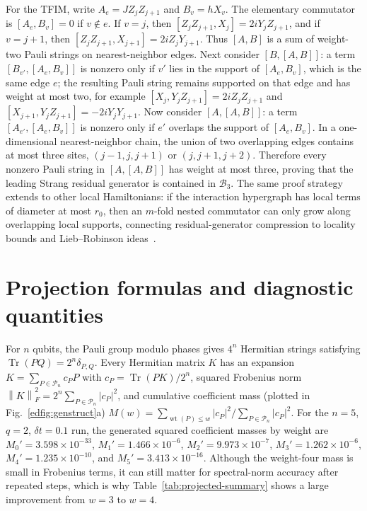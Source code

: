 \documentclass[aps,prresearch,reprint,superscriptaddress,nofootinbib,amsmath,amssymb]{revtex4-2}
\newcommand{\tfim}{TFIM}
\newcommand{\norm}[1]{\left\lVert #1 \right\rVert}
\newcommand{\abs}[1]{\left\lvert #1 \right\rvert}
\newcommand{\Tr}{\operatorname{Tr}}
\newcommand{\cB}{\mathcal{B}}
\newcommand{\cP}{\mathcal{P}}
\newcommand{\dt}{\delta t}
\begin{document}
For the \tfim{}, write $A_e=JZ_jZ_{j+1}$ and $B_v=hX_v$. The elementary commutator is $[A_e,B_v]=0$ if $v\notin e$. If $v=j$, then $[Z_jZ_{j+1},X_j]=2iY_jZ_{j+1}$, and if $v=j+1$, then $[Z_jZ_{j+1},X_{j+1}]=2iZ_jY_{j+1}$. Thus $[A,B]$ is a sum of weight-two Pauli strings on nearest-neighbor edges. Next consider $[B,[A,B]]$: a term $[B_{v'},[A_e,B_v]]$ is nonzero only if $v'$ lies in the support of $[A_e,B_v]$, which is the same edge $e$; the resulting Pauli string remains supported on that edge and has weight at most two, for example $[X_j,Y_jZ_{j+1}]=2iZ_jZ_{j+1}$ and $[X_{j+1},Y_jZ_{j+1}]=-2iY_jY_{j+1}$. Now consider $[A,[A,B]]$: a term $[A_{e'},[A_e,B_v]]$ is nonzero only if $e'$ overlaps the support of $[A_e,B_v]$. In a one-dimensional nearest-neighbor chain, the union of two overlapping edges contains at most three sites, $(j-1,j,j+1)$ or $(j,j+1,j+2)$. Therefore every nonzero Pauli string in $[A,[A,B]]$ has weight at most three, proving that the leading Strang residual generator is contained in $\cB_3$. The same proof strategy extends to other local Hamiltonians: if the interaction hypergraph has local terms of diameter at most $r_0$, then an $m$-fold nested commutator can only grow along overlapping local supports, connecting residual-generator compression to locality bounds and Lieb--Robinson ideas~\cite{lieb1972,tran2020}.

\section{Projection formulas and diagnostic quantities}
\label{app:projection}

For $n$ qubits, the Pauli group modulo phases gives $4^n$ Hermitian strings satisfying $\Tr(PQ)=2^n\delta_{P,Q}$. Every Hermitian matrix $K$ has an expansion $K=\sum_{P\in\cP_n} c_P P$ with $c_P=\Tr(PK)/2^n$, squared Frobenius norm $\norm{K}_F^2=2^n\sum_{P\in\cP_n}\abs{c_P}^2$, and cumulative coefficient mass (plotted in Fig.~\ref{edfig:genstruct}a) $M(w)=\sum_{\operatorname{wt}(P)\leq w}\abs{c_P}^2/\sum_{P\in\cP_n}\abs{c_P}^2$. For the $n=5$, $q=2$, $\dt=0.1$ run, the generated squared coefficient masses by weight are $M_0'=3.598\times10^{-33}$, $M_1'=1.466\times10^{-6}$, $M_2'=9.973\times10^{-7}$, $M_3'=1.262\times10^{-6}$, $M_4'=1.235\times10^{-10}$, and $M_5'=3.413\times10^{-16}$. Although the weight-four mass is small in Frobenius terms, it can still matter for spectral-norm accuracy after repeated steps, which is why Table~\ref{tab:projected-summary} shows a large improvement from $w=3$ to $w=4$.
\end{document}
